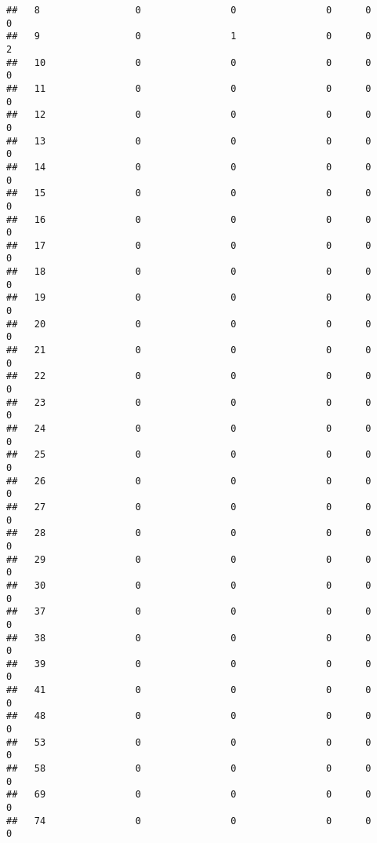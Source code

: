 \documentclass[]{article}
\begin{document}
\begin{verbatim}
##   8                 0                0                0      0                0
##   9                 0                1                0      0                2
##   10                0                0                0      0                0
##   11                0                0                0      0                0
##   12                0                0                0      0                0
##   13                0                0                0      0                0
##   14                0                0                0      0                0
##   15                0                0                0      0                0
##   16                0                0                0      0                0
##   17                0                0                0      0                0
##   18                0                0                0      0                0
##   19                0                0                0      0                0
##   20                0                0                0      0                0
##   21                0                0                0      0                0
##   22                0                0                0      0                0
##   23                0                0                0      0                0
##   24                0                0                0      0                0
##   25                0                0                0      0                0
##   26                0                0                0      0                0
##   27                0                0                0      0                0
##   28                0                0                0      0                0
##   29                0                0                0      0                0
##   30                0                0                0      0                0
##   37                0                0                0      0                0
##   38                0                0                0      0                0
##   39                0                0                0      0                0
##   41                0                0                0      0                0
##   48                0                0                0      0                0
##   53                0                0                0      0                0
##   58                0                0                0      0                0
##   69                0                0                0      0                0
##   74                0                0                0      0                0

\end{verbatim}
\end{document}
